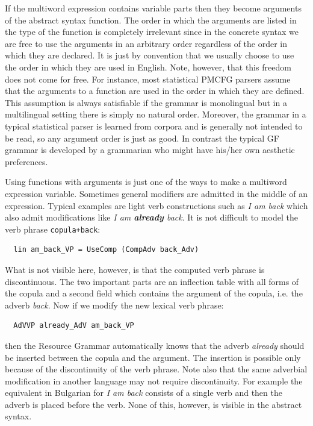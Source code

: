\documentclass[output=paper]{LSP/langsci}
\begin{document}
If the multiword expression
contains variable parts then they become arguments of the abstract
syntax function. The order in which the arguments are listed in the
type of the function is completely irrelevant since in the concrete
syntax we are free to use the arguments in an arbitrary order regardless 
of the order in which they are declared. It is just by convention that
we usually choose to use the order in which they are used in English.
Note, however, that this freedom does not come for free. 
For instance, most statistical PMCFG parsers assume that 
the arguments to a function are used in the order in which they are defined.
This assumption is always satisfiable if the grammar is monolingual but in 
a multilingual setting there is simply no natural order. Moreover,
the grammar in a typical statistical parser is learned from corpora
and is generally not intended to be read, so any argument order
is just as good. In contrast the typical GF grammar
is developed by a grammarian who might have his/her own aesthetic
preferences.

Using functions with arguments is just one of the ways to make
a multiword expression variable. Sometimes general modifiers 
are admitted in the middle of an expression.
Typical examples are light verb constructions such as \textit{I am back}
which also admit modifications like \textit{I am \textbf{already} back}.
It is not difficult to model the verb phrase \verb=copula+back=:
\begin{verbatim}
  lin am_back_VP = UseComp (CompAdv back_Adv)
\end{verbatim}
What is not visible here, however, is that the computed verb phrase
is discontinuous. The two important parts are an inflection table with
all forms of the copula and a second field which contains the argument
of the copula, i.e. the adverb \textit{back}. 
Now if we modify the new lexical verb phrase:
\begin{verbatim}
  AdVVP already_AdV am_back_VP
\end{verbatim}
then the Resource Grammar automatically knows that the adverb
\textit{already} should be inserted between the copula and the argument.
The insertion is possible only because of the discontinuity of 
the verb phrase. Note also that the same adverbial modification in another
language may not require discontinuity. For example the equivalent in
Bulgarian for \textit{I am back} consists of a single verb and then 
the adverb is placed before the verb. None of this, however, is
visible in the abstract syntax.
\end{document}
